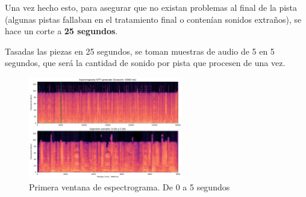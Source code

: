 Una vez hecho esto, para asegurar que no existan problemas al final de la pista (algunas pistas fallaban en el tratamiento final o contenían sonidos extraños), se hace un corte a \textbf{25 segundos}.

Tasadas las piezas en 25 segundos, se toman muestras de audio de 5 en 5 segundos, que será la cantidad de sonido por pista que procesen de una vez.

\begin{figure}[H]
    \centering
    \includegraphics[width=0.6\textwidth]{images/spect_window_1.png}
    \caption{Primera ventana de espectrograma. De 0 a 5 segundos}
\end{figure}
